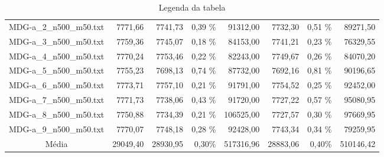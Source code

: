 \begin{landscape}
\begin{table}[ht]
\begin{tabular}{| c | r | r | r | r | r | r | r |  }
		MDG-a\_2\_n500\_m50.txt&7771,66&7741,73&0,39 \%&91312,00&7732,30&0,51 \%&89271,50\\
		MDG-a\_3\_n500\_m50.txt&7759,36&7745,07&0,18 \%&84153,00&7741,21&0,23 \%&76329,55\\
		MDG-a\_4\_n500\_m50.txt&7770,24&7753,46&0,22 \%&82243,00&7749,67&0,26 \%&84070,20\\
		MDG-a\_5\_n500\_m50.txt&7755,23&7698,13&0,74 \%&87732,00&7692,16&0,81 \%&90196,65\\
		MDG-a\_6\_n500\_m50.txt&7773,71&7757,10&0,21 \%&91791,00&7754,52&0,25 \%&92452,00\\
		MDG-a\_7\_n500\_m50.txt&7771,73&7738,06&0,43 \%&91720,00&7727,22&0,57 \%&95080,95\\
		MDG-a\_8\_n500\_m50.txt&7750,88&7734,39&0,21 \%&106525,00&7727,57&0,30 \%&97669,95\\
		MDG-a\_9\_n500\_m50.txt&7770,07&7748,18&0,28 \%&92428,00&7743,34&0,34 \%&79259,95\\
\hline 		Média&29049,40&28930,95&0,30\%&517316,96&28883,06&0,40\%&510146,42\\ 
\hline
	\end{tabular}
	\caption{Legenda da tabela}
	\label{seu_label}
	\end{table}
\end{landscape}
